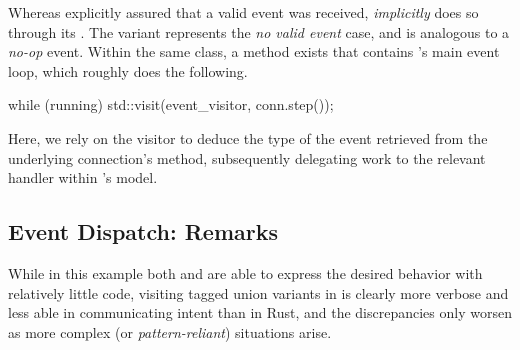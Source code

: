 Whereas \wmrs explicitly assured that a valid event was received, \wmcpp
\textit{implicitly} does so through its . The
 variant represents the \textit{no valid event} case, and
is analogous to a \textit{no-op} event. Within the same class, a method exists
that contains \mbox{\wmcpp}'s main event loop, which roughly does the following.

\begin{cppblock}
  while (running)
    std::visit(event_visitor, conn.step());
\end{cppblock}

Here, we rely on the visitor to deduce the type of the event retrieved from the
underlying connection's  method, subsequently delegating work to the
relevant handler within \wmcpp's model.

\subsection{Event Dispatch: Remarks}

While in this example both \wmrs and \wmcpp are able to express the desired
behavior with relatively little code, visiting tagged union variants in \cpp is
clearly more verbose and less able in communicating intent than in Rust, and
the discrepancies only worsen as more complex (or \textit{pattern-reliant})
situations arise\cite{stdvisitwrong}.
